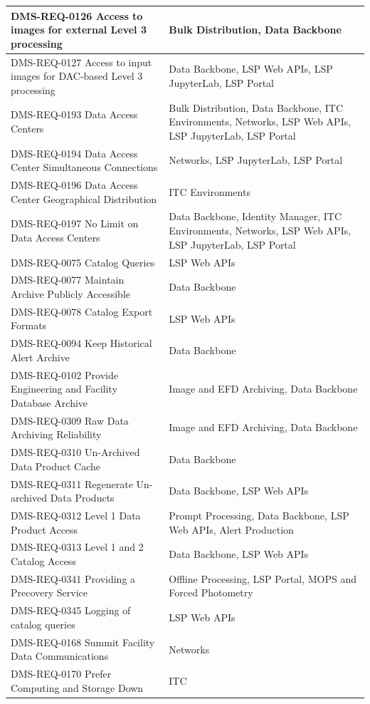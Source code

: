 \documentclass[DM,lsstdraft,toc]{lsstdoc}
\begin{document}
\begin{xtabular}{|p{0.4\textwidth}|p{0.55\textwidth}|}
DMS-REQ-0126 Access to images for external Level 3 processing & Bulk
Distribution, Data Backbone\\ \hline
DMS-REQ-0127 Access to input images for DAC-based Level 3 processing &
Data Backbone, LSP Web APIs, LSP JupyterLab, LSP
Portal\\ \hline
DMS-REQ-0193 Data Access Centers & Bulk Distribution, Data Backbone, ITC
Environments, Networks, LSP Web APIs, LSP JupyterLab, LSP
Portal\\ \hline
DMS-REQ-0194 Data Access Center Simultaneous Connections & Networks, LSP
JupyterLab, LSP Portal\\ \hline
DMS-REQ-0196 Data Access Center Geographical Distribution & ITC
Environments\\ \hline
DMS-REQ-0197 No Limit on Data Access Centers & Data Backbone, Identity
Manager, ITC Environments, Networks, LSP Web APIs, LSP JupyterLab,
LSP Portal\\ \hline
DMS-REQ-0075 Catalog Queries & LSP Web APIs\\ \hline
DMS-REQ-0077 Maintain Archive Publicly Accessible & Data
Backbone\\ \hline
DMS-REQ-0078 Catalog Export Formats & LSP Web APIs\\ \hline
DMS-REQ-0094 Keep Historical Alert Archive & Data
Backbone\\ \hline
DMS-REQ-0102 Provide Engineering and Facility Database Archive & Image
and EFD Archiving, Data Backbone\\ \hline
DMS-REQ-0309 Raw Data Archiving Reliability & Image and EFD Archiving,
Data Backbone\\ \hline
DMS-REQ-0310 Un-Archived Data Product Cache & Data
Backbone\\ \hline
DMS-REQ-0311 Regenerate Un-archived Data Products & Data Backbone, LSP Web APIs\\ \hline
DMS-REQ-0312 Level 1 Data Product Access & Prompt Processing, Data
Backbone, LSP Web APIs, Alert Production\\ \hline
DMS-REQ-0313 Level 1 and 2 Catalog Access & Data Backbone, LSP Web APIs\\ \hline
DMS-REQ-0341 Providing a Precovery Service & Offline Processing, LSP
Portal, MOPS and Forced Photometry\\ \hline
DMS-REQ-0345 Logging of catalog queries & LSP Web APIs\\ \hline
DMS-REQ-0168 Summit Facility Data Communications &
Networks\\ \hline
DMS-REQ-0170 Prefer Computing and Storage Down & ITC

\end{xtabular}
\end{document}
